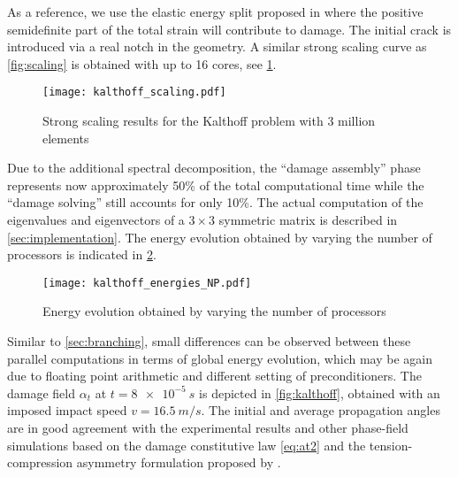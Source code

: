 As a reference, we use the elastic energy split proposed in \cite{FreddiRoyer-Carfagni:2010} where the positive semidefinite part of the total strain will contribute to damage. The initial crack is introduced via a real notch in the geometry. A similar strong scaling curve as \cref{fig:scaling} is obtained with up to 16 cores, see \cref{fig:kalscaling}.
\begin{figure}[htbp]
\centering
\texttt{[image: kalthoff\_scaling.pdf]}
\caption{Strong scaling results for the Kalthoff problem with 3 million elements} \label{fig:kalscaling}
\end{figure}
Due to the additional spectral decomposition, the ``damage assembly'' phase represents now approximately 50\% of the total computational time while the ``damage solving'' still accounts for only 10\%. The actual computation of the eigenvalues and eigenvectors of a $3\times 3$ symmetric matrix is described in \cref{sec:implementation}. The energy evolution obtained by varying the number of processors is indicated in \cref{fig:kalenergy}.
\begin{figure}[htbp]
\centering
\texttt{[image: kalthoff\_energies\_NP.pdf]}
\caption{Energy evolution obtained by varying the number of processors} \label{fig:kalenergy}
\end{figure}
Similar to \cref{sec:branching}, small differences can be observed between these parallel computations in terms of global energy evolution, which may be again due to floating point arithmetic and different setting of preconditioners. The damage field $\alpha_t$ at $t=\SI{8e-5}{s}$ is depicted in \cref{fig:kalthoff}, obtained with an imposed impact speed $v=\SI{16.5}{m/s}$. The initial and average propagation angles are in good agreement with the experimental results and other phase-field simulations \cite{BordenVerhooselScottHughesLandis:2012,HofackerMiehe:2012} based on the damage constitutive law \eqref{eq:at2} and the tension-compression asymmetry formulation proposed by \cite{MieheHofackerWelschinger:2010}.

